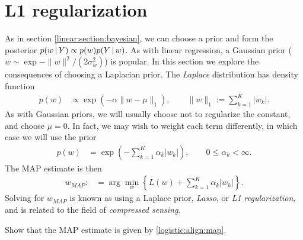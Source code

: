 \section{L1 regularization}
\label{logistic:section:L1}

As in section \ref{linear:section:bayesian}, we can choose a prior and form the posterior $p(w{\,|\,} Y)\propto p(w)p(Y{\,|\,} w)$.  As with linear regression, a Gaussian prior ($w\sim\exp{-\|w\|^2/(2\sigma_w^2)}$) is popular.  In this section we explore the consequences of choosing a Laplacian prior.  The \emph{Laplace} distribution has density function
\begin{align*}
  p(w) &\propto \exp\left( -\alpha\|w - \mu\|_1 \right), \qquad \|w\|_1 := \sum_{k=1}^K |w_k|.
\end{align*}
As with Gaussian priors, we will usually choose not to regularize the constant, and choose $\mu=0$.  In fact, we may wish to weight each term differently, in which case we will use the prior
\begin{align*}
  p(w) &= \exp\left( -\sum_{k=1}^K\alpha_k|w_k| \right), \qquad 0\leq\alpha_k<\infty.
\end{align*}
The MAP estimate is then
\begin{align}
  w_{MAP} :&= \arg\min_w\left\{ L(w) + \sum_{k=1}^K\alpha_k|w_k| \right\}.
  \label{logistic:align:map}
\end{align}
Solving for $w_{MAP}$ is known as using a Laplace prior, \emph{Lasso}, or \emph{L1 regularization}, and is related to the field of \emph{compressed sensing}.

\begin{exercise}
  Show that the MAP estimate is given by \eqref{logistic:align:map}.
\end{exercise}

